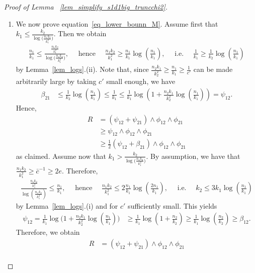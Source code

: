 \documentclass{article}
\begin{document}
\begin{proof}[Proof of Lemma ~\ref{lem_simplify_s1d1big_truncchi2}]
\begin{enumerate}
    \item 
We now prove equation~\eqref{eq_lower_bounn_M}. 
Assume first that $k_1 \leq \frac{k_2}{\log\big(\frac{n_1k_2}{k_1^2}\big)}$. 
Then we obtain
\begin{align}
    \frac{n_1}{k_1} \leq \frac{\frac{n_1k_2}{k_1^2}}{\log\big(\frac{n_1k_2}{k_1^2}\big)},\quad  \text{ hence } \quad \frac{n_1k_2}{k_1^2} \geq \frac{n_1}{k_1} \log\left(\frac{n_1}{k_1}\right), \quad \text{ i.e. } \quad \frac{1}{k_1} \geq \frac{1}{k_2} \log\left(\frac{n_1}{k_1}\right)\label{eq_k2_geq_k1_log}
\end{align}
by Lemma~\ref{lem_logs}.(ii). 
Note that, since $\frac{n_2k_1}{k_2^2} \geq \frac{n_1}{k_1} \geq \frac{1}{c'} $ can be made arbitrarily large by taking $c'$ small enough, we have
\begin{align*}
    \beta_{21} &\leq \frac{1}{k_2} \log\left(\frac{n_1}{k_1}\right) \leq \frac{1}{k_1} \leq \frac{1}{k_1}\log\left(1 + \frac{n_2k_1}{k_2^2}\log\left(\frac{n_1}{k_1}\right)\right)  = \psi_{12}.
\end{align*}
Hence,
\begin{align*}
    R &= (\psi_{12} + \psi_{21}) \land \phi_{12} \land \phi_{21} \\
    &\geq \psi_{12}  \land \phi_{12} \land \phi_{21} \\
    &\geq \frac{1}{2}(\psi_{12} + \beta_{21}) \land \phi_{12} \land \phi_{21}
\end{align*}
as claimed.
Assume now that $k_1 > \frac{k_2}{\log\big(\frac{n_1k_2}{k_1^2}\big)}$. 
By assumption, we have that $\frac{n_1k_2}{k_1^2} \geq \bar{c}^{-1} \geq 2e$.
Therefore, 
\begin{align*}
    \frac{\frac{n_1 k_2}{k_1^2}}{\log\left(\frac{n_1 k_2}{k_1^2}\right)}\leq \frac{n_1}{k_1}, \quad  \text{ hence } \quad \frac{n_1 k_2}{k_1^2} \leq 2 \frac{n_1}{k_1} \log\left(\frac{2n_1}{k_1}\right), \quad \text{ i.e. } \quad k_2 \leq 3 k_1 \log\left(\frac{n_1}{k_1}\right)
\end{align*}
by Lemma~\ref{lem_logs}.(i) and for $c'$ sufficiently small.
This yields
\begin{align*}
    \psi_{12} = \frac{1}{k_1} \log\Big(1 +  \frac{n_2k_1}{k_2^2}\log\left(\frac{n_1}{k_1}\right)\Big)
    & \geq \frac{1}{k_1} \log\left(1+\frac{n_2}{k_2}\right)\geq \frac{1}{k_1} \log\left(\frac{n_2}{k_2}\right) \geq \beta_{12}.
\end{align*}
Therefore, we obtain
\begin{align*}
    R &= (\psi_{12} + \psi_{21}) \land \phi_{12} \land \phi_{21}\\

\end{align*}
\end{enumerate}
\end{proof}
\end{document}
